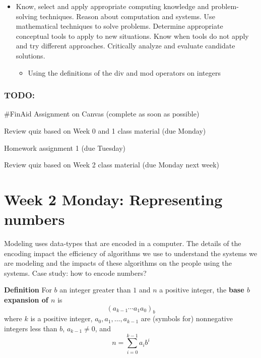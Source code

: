 \documentclass[12pt, oneside]{article}
\begin{document}
\begin{itemize}
\item Know, select and apply appropriate computing knowledge and problem-solving techniques. Reason about computation and systems. Use mathematical techniques to solve problems. Determine appropriate conceptual tools to apply to new situations. Know when tools do not apply and try different approaches. Critically analyze and evaluate candidate solutions.
\begin{itemize}
    \item Using the definitions of the div and mod operators on integers
\end{itemize}

\end{itemize}

\subsubsection*{TODO:}
\begin{list}
   {\itemsep2pt}
   \item \#FinAid Assignment on Canvas (complete as soon as possible) 
   \item Review quiz based on Week 0 and 1 class material (due Monday)
   \item Homework assignment 1 (due Tuesday)
   \item Review quiz based on Week 2 class material (due Monday next week)
\end{list}

\newpage




\section*{Week 2 Monday: Representing numbers}


Modeling uses data-types that are encoded in a computer.
The details of the encoding impact the efficiency of algorithms
we use to understand the systems we are modeling and the 
impacts of these algorithms on the people using the systems.
Case study: how to encode numbers?

\vfill 

{\bf Definition} For $b$ an integer greater than $1$ and $n$ a positive integer, 
the {\bf base $b$ expansion of $n$}  is
\[
(a_{k-1} \cdots a_1 a_0)_b
\]
where $k$ is a positive integer, $a_0, a_1, \ldots, a_{k-1}$ 
are (symbols for) nonnegative integers less than $b$, $a_{k-1} \neq  0$, and
\[
n =  \sum_{i=0}^{k-1} a_{i} b^{i}
\]
\end{document}
